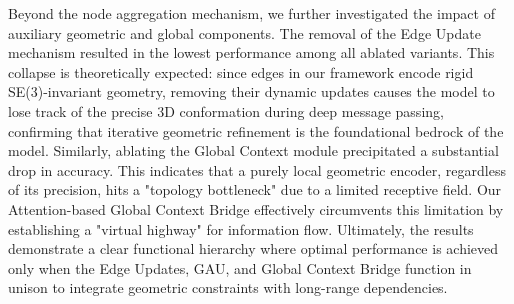 \documentclass{article}
\theoremstyle{plain}
\theoremstyle{definition}
\theoremstyle{remark}
\begin{document}
{Beyond the node aggregation mechanism, we further investigated the impact of auxiliary geometric and global components. The removal of the Edge Update mechanism resulted in the lowest performance among all ablated variants. This collapse is theoretically expected: since edges in our framework encode rigid SE(3)-invariant geometry, removing their dynamic updates causes the model to lose track of the precise 3D conformation during deep message passing, confirming that iterative geometric refinement is the foundational bedrock of the model. Similarly, ablating the Global Context module precipitated a substantial drop in accuracy. This indicates that a purely local geometric encoder, regardless of its precision, hits a "topology bottleneck" due to a limited receptive field. Our Attention-based Global Context Bridge effectively circumvents this limitation by establishing a "virtual highway" for information flow. Ultimately, the results demonstrate a clear functional hierarchy where optimal performance is achieved only when the Edge Updates, GAU, and Global Context Bridge function in unison to integrate geometric constraints with long-range dependencies.

}
\end{document}

